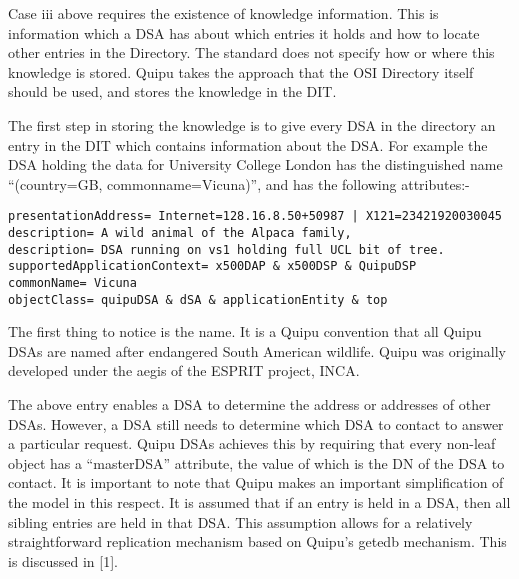 Case iii above requires the existence of knowledge information.  This is
information which a DSA has about which entries it holds and how to locate
other entries in the Directory.
The standard does not specify how or where this knowledge is stored.
Quipu takes the approach that the OSI Directory itself should be used, and
stores the knowledge in the DIT.

The first step in storing the knowledge is to give every DSA in the
directory an entry in the DIT which contains information about the DSA. 
For example
the DSA holding the data for University College London has the
distinguished name ``(country=GB, commonname=Vicuna)'', and has the following attributes:-
{\small
\begin{verbatim}
presentationAddress= Internet=128.16.8.50+50987 | X121=23421920030045
description= A wild animal of the Alpaca family, 
description= DSA running on vs1 holding full UCL bit of tree.
supportedApplicationContext= x500DAP & x500DSP & QuipuDSP
commonName= Vicuna
objectClass= quipuDSA & dSA & applicationEntity & top
\end{verbatim}\par}
The first thing to notice is the name. It is a Quipu convention that all
Quipu DSAs are named after endangered South American wildlife. Quipu was
originally developed under the aegis of the ESPRIT project, INCA.

The above entry enables a DSA to determine the address or addresses of other 
DSAs.
However, a DSA still needs to determine which DSA to
contact to answer a particular request.  Quipu DSAs achieves this by requiring
that every non-leaf object 
has a ``masterDSA'' attribute, the value of which is the DN of the DSA to
contact.  
It is important to note that Quipu makes an important simplification of the
model in this respect.  It is assumed that if an entry is held in a DSA,
then all sibling entries are held in that DSA.  This assumption allows for a
relatively straightforward replication mechanism based on Quipu's getedb
mechanism. This is discussed in [1].


